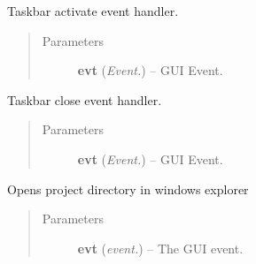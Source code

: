 \documentclass[letterpaper,10pt,english]{sphinxmanual}
\begin{document}
\begin{fulllineitems}
\begin{fulllineitems}
\end{fulllineitems}


\begin{fulllineitems}
\label{api:wos.GUI.OnTaskBarActivate}
Taskbar activate event handler.
\begin{quote}\begin{description}
\item[{Parameters}] \leavevmode
\textbf{evt} (\emph{Event.}) -- GUI Event.

\end{description}\end{quote}

\end{fulllineitems}


\begin{fulllineitems}
\label{api:wos.GUI.OnTaskBarClose}
Taskbar close event handler.
\begin{quote}\begin{description}
\item[{Parameters}] \leavevmode
\textbf{evt} (\emph{Event.}) -- GUI Event.

\end{description}\end{quote}

\end{fulllineitems}


\begin{fulllineitems}
\label{api:wos.GUI.OpenProjectDir}
Opens project directory in windows explorer
\begin{quote}\begin{description}
\item[{Parameters}] \leavevmode
\textbf{evt} (\emph{event.}) -- The GUI event.

\end{description}\end{quote}

\end{fulllineitems}



\end{fulllineitems}
\end{document}
